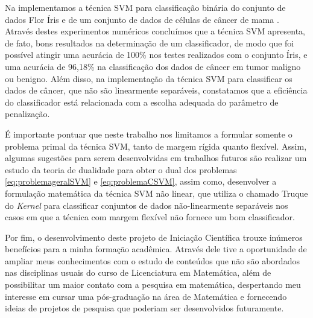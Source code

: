 \documentclass[12pt,a4paper]{scrartcl}
\theoremstyle{definition}%
\begin{document}
Na  implementamos a técnica SVM para classificação binária do conjunto de dados Flor Íris e de um conjunto de dados de células de câncer de mama \cite{Dua:2019}. Através destes experimentos numéricos concluímos que a técnica SVM apresenta, de fato, bons resultados na determinação de um classificador, de modo que foi possível atingir uma acurácia de 100\% nos testes realizados com o conjunto Íris, e uma acurácia de 96,18\% na classificação dos dados de câncer em tumor maligno ou benigno. Além disso, na implementação da técnica SVM para classificar os dados de câncer, que não são linearmente separáveis, constatamos que a eficiência do classificador está relacionada com a escolha adequada do parâmetro de penalização.

É importante pontuar que neste trabalho nos limitamos a formular somente o problema primal da técnica SVM, tanto de margem rígida quanto flexível. Assim, algumas sugestões para serem desenvolvidas em trabalhos futuros são realizar um estudo da teoria de dualidade para obter o dual dos problemas \eqref{eq:problemageralSVM} e \eqref{eq:problemaCSVM}, assim como, desenvolver a formulação matemática da técnica SVM não linear, que utiliza o chamado Truque do \emph{Kernel} para classificar conjuntos de dados não-linearmente separáveis nos casos em que a técnica com margem flexível não fornece um bom classificador.

Por fim, o desenvolvimento deste projeto de Iniciação Científica trouxe inúmeros benefícios para a minha formação acadêmica. Através dele tive a oportunidade de ampliar meus conhecimentos com o estudo de conteúdos que não são abordados nas disciplinas usuais do curso de Licenciatura em Matemática, além de possibilitar um maior contato com a pesquisa em matemática, despertando meu interesse em cursar uma pós-graduação na área de Matemática e fornecendo ideias de projetos de pesquisa que poderiam ser desenvolvidos futuramente. 
\newpage

\printbibliography
\end{document}
